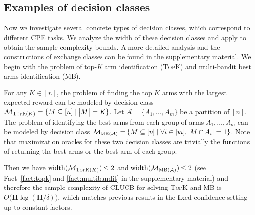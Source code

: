 \documentclass{article}
\newcommand{\wei}[1]{}
\newcommand{\wei}[1]{{\color{blue!50!black}  [\text{Wei:} #1]}}
\newcommand{\Algorithm}{{\small \textsf{CLUCB}}\xspace}
\newcommand{\Problem}{{CPE}\xspace}
\newcommand{\M}{\mathcal M}
\DeclareMathOperator{\rank}{width}
\newcommand{\MultiIdent}{\textsc{TopK}\xspace}
\newcommand{\MultiBandit}{\textsc{MB}\xspace}
\begin{document}
\subsection{Examples of decision classes}
\vspace{-0.5em}
Now we investigate several concrete types of decision classes, which correspond to different \Problem tasks.
We analyze the width of these decision classes and apply  to obtain the sample complexity bounds.
A more detailed analysis and the constructions of exchange classes can be found in the supplementary material.
We begin with the problem of top-$K$ arm identification (\MultiIdent) and multi-bandit best arms identification (\MultiBandit).
\begin{example}[\MultiIdent and \MultiBandit]
\label{example:topk}
For any $K\in[n]$, the problem of finding the top $K$ arms with the largest expected reward can be modeled by decision class $\M_{\MultiIdent(K)}=\{M\subseteq [n] \mid \big|M\big| = K\}$.
Let $\mathcal A=\{A_1,\ldots,A_m\}$ be a partition of $[n]$. 
The problem of identifying the best arms from each group of arms $A_1,\ldots,A_m$ can be modeled by decision class
$\M_{\MultiBandit(\mathcal A)} = \{M \subseteq [n] \mid \forall i\in [m], |M\cap A_i| = 1\}$.
Note that maximization oracles for these two decision classes are trivially the functions of returning the best arms or the best arm of each group.

Then we have $\rank(\M_{\MultiIdent(K)}) \le 2$ and $\rank(\M_{\MultiBandit(\mathcal A)}) \le 2$
(see Fact~\ref{fact:topk} and \ref{fact:multibandit} in the supplementary material) and therefore the sample complexity of \Algorithm for solving \MultiIdent and \MultiBandit is $O\big(\mathbf H \log(\mathbf H/\delta)\big)$,  which matches previous results in the fixed confidence setting \citep{kalyanakrishnan2012pac,gabillon2012best,kaufmann2013information} up to constant factors.
\end{example}
\end{document}
